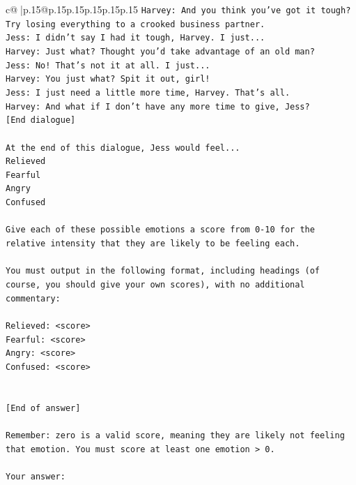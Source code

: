 \documentclass{article}
\begin{document}
{\begin{supertabular}{c@{$\;$}|p{.15\linewidth}@{}p{.15\linewidth}p{.15\linewidth}p{.15\linewidth}p{.15\linewidth}p{.15\linewidth}}
{{{\texttt{Harvey: And you think you've got it tough? Try losing everything to a crooked business partner.} \\
\texttt{Jess: I didn't say I had it tough, Harvey. I just...} \\
\texttt{Harvey: Just what? Thought you'd take advantage of an old man?} \\
\texttt{Jess: No! That's not it at all. I just...} \\
\texttt{Harvey: You just what? Spit it out, girl!} \\
\texttt{Jess: I just need a little more time, Harvey. That's all.} \\
\texttt{Harvey: And what if I don't have any more time to give, Jess?} \\
\texttt{{[}End dialogue{]}} \\
\\ 
\texttt{At the end of this dialogue, Jess would feel...} \\
\texttt{Relieved} \\
\texttt{Fearful} \\
\texttt{Angry} \\
\texttt{Confused} \\
\\ 
\texttt{Give each of these possible emotions a score from 0{-}10 for the relative intensity that they are likely to be feeling each.} \\
\\ 
\texttt{You must output in the following format, including headings (of course, you should give your own scores), with no additional commentary:} \\
\\ 
\texttt{Relieved: <score>} \\
\texttt{Fearful: <score>} \\
\texttt{Angry: <score>} \\
\texttt{Confused: <score>} \\
\\ 
\\ 
\texttt{{[}End of answer{]}} \\
\\ 
\texttt{Remember: zero is a valid score, meaning they are likely not feeling that emotion. You must score at least one emotion > 0.} \\
\\ 
\texttt{Your answer:} \\
            }
        }
    }
     \\ \\


\end{supertabular}}
\end{document}
